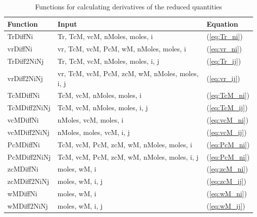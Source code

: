 \documentclass[internal,english]{sintefmemo2012}
\numberwithin{equation}{section}
\newcommand*{\reff}[1]{(\ref{#1})}
\begin{document}
\begin{table}[t]
\begin{center}
\caption{Functions for calculating derivatives of the reduced quantities}
\label{tab:functionsCrit}
\begin{tabular}{l l l}
\hline%
Function 	& Input   & Equation \\
\hline
TrDiffNi	& Tr, TcM, vcM, nMoles, moles, i	& \reff{eq:Tr_ni} \\
vrDiffNi	& vr, TcM, vcM, PcM, wM, nMoles, moles, i & \reff{eq:vr_ni} \\
TrDiff2NiNj	& Tr, TcM, vcM, nMoles, moles, i, j	& \reff{eq:Tr_ij} \\
vrDiff2NiNj	& vr, TcM, vcM, PcM, zcM, wM, nMoles, moles, i, j	& \reff{eq:vr_ij} \\

TcMDiffNi	& TcM, vcM, nMoles, moles, i	& \reff{eq:TcM_ni} \\
TcMDiff2NiNj	& TcM, vcM, nMoles, moles, i, j	& \reff{eq:TcM_ij} \\
vcMDiffNi	& nMoles, vcM, moles, i	& \reff{eq:vcM_ni} \\
vcMDiff2NiNj	& nMoles, moles, vcM, i, j	& \reff{eq:vcM_ij} \\
PcMDiffNi	& TcM, vcM, PcM, zcM, wM, nMoles, moles, i	& \reff{eq:PcM_ni} \\
PcMDiff2NiNj	& TcM, vcM, PcM, zcM, wM, nMoles, moles, i, j	& \reff{eq:PcM_ni} \\
zcMDiffNi	& moles, wM, i	& \reff{eq:zcM_ni} \\
zcMDiff2NiNj	& moles, wM, i, j	& \reff{eq:zcM_ij} \\
wMDiffNi	& moles, wM, i	& \reff{eq:wM_ni} \\
wMDiff2NiNj	& moles, wM, i, j	& \reff{eq:wM_ij} \\
\hline
\end{tabular}
\end{center}
\end{table}
\end{document}
